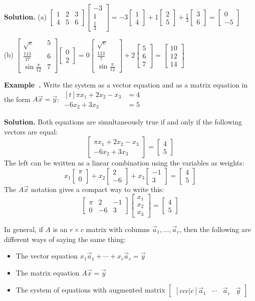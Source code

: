 \documentclass[11pt, letterpaper]{report}
\newenvironment{notes}{}{}
\newenvironment{book}{}{}
\newcounter{example}[section]
\newcommand{\example}{\refstepcounter{example}%
\par\noindent\textbf{Example~\theexample.} }
\newcommand{\bbvec}[2]{
  \begin{bmatrix} #1 \\ #2 \end{bmatrix}
}
\newcommand{\bbbvec}[3]{
  \begin{bmatrix} #1 \\ #2 \\ #3 \end{bmatrix}
}
\begin{document}
\begin{notes}
\vfill
\end{notes}

\begin{book}
\textbf{Solution.} (a) $\begin{bmatrix}
1 & 2 & 3 \\
4 & 5 & 6
\end{bmatrix} \bbbvec{-3}{1}{\frac{1}{3}} = -3 \bbvec{1}{4}+1 \bbvec{2}{5}+\frac{1}{3}\bbvec{3}{6} = \bbvec{0}{-5}$

(b) $
\begin{bmatrix}
\sqrt{e} & 5 \\
\frac{113}{17} & 6 \\
\sin \frac{\pi}{12} & 7
\end{bmatrix}\bbvec{0}{2} = 0 \bbbvec{\sqrt{e}}{\frac{113}{7}}{\sin \frac{\pi}{12}} +2 \bbbvec{5}{6}{7} = \bbbvec{10}{12}{14}$

 \blacksquare

\end{book}

\example Write the system as a vector equation and as a matrix equation in the form $A \vec{x}=\vec{y}$:
\quad $\begin{aligned}[t]
\pi x_1 + 2x_2 - x_3 &= 4 \\
-6x_2+3x_3 &= 5
\end{aligned}$

\begin{notes}
\vfill
\end{notes}

\begin{book}
\textbf{Solution.} Both equations are simultaneously true if and only if the following vectors are equal:
\[\bbvec{\pi x_1 + 2x_2-x_3}{-6x_2+3x_3} = \bbvec{4}{5} \]
The left can be written as a linear combination using the variables as weights:
\[x_1\bbvec{\pi}{0} +x_2 \bbvec{2}{-6} + x_3 \bbvec{-1}{3}  = \bbvec{4}{5} \]
The $A\vec{x}$ notation gives a compact way to write this:
\[\begin{bmatrix}
\pi & 2 & -1 \\
0 & -6 & 3
\end{bmatrix}\bbbvec{x_1}{x_2}{x_3} = \bbvec{4}{5}\]
\blacksquare
\end{book}

In general, if $A$ is an $r \times c$ matrix with columns $\vec{a}_1, \ldots, \vec{a}_c$, then the following are different ways of saying the same thing:
\begin{itemize}
\item The vector equation $ x_1 \vec{a}_1 + \cdots + x_c\vec{a}_c = \vec{y}$
\item The matrix equation $A\vec{x}=\vec{y}$
\item The system of equations with augmented matrix $\begin{bmatrix}[ccc|c]
\vec{a}_{1} & \cdots & \vec{a}_c & \vec{y}
\end{bmatrix}$
\end{itemize}
\end{document}
